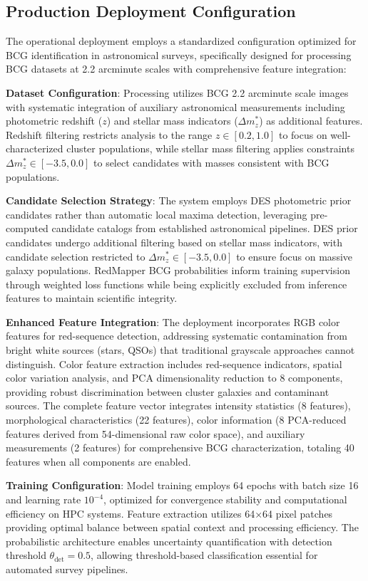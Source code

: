 \documentclass[twocolumn,10pt]{aastex631}
\begin{document}
\subsection{Production Deployment Configuration}

The operational deployment employs a standardized configuration optimized for BCG identification in astronomical surveys, specifically designed for processing BCG datasets at 2.2 arcminute scales with comprehensive feature integration:

\textbf{Dataset Configuration}: Processing utilizes BCG 2.2 arcminute scale images with systematic integration of auxiliary astronomical measurements including photometric redshift ($z$) and stellar mass indicators ($\Delta m^*_z$) as additional features. Redshift filtering restricts analysis to the range $z \in [0.2, 1.0]$ to focus on well-characterized cluster populations, while stellar mass filtering applies constraints $\Delta m^*_z \in [-3.5, 0.0]$ to select candidates with masses consistent with BCG populations.

\textbf{Candidate Selection Strategy}: The system employs DES photometric prior candidates rather than automatic local maxima detection, leveraging pre-computed candidate catalogs from established astronomical pipelines. DES prior candidates undergo additional filtering based on stellar mass indicators, with candidate selection restricted to $\Delta m^*_z \in [-3.5, 0.0]$ to ensure focus on massive galaxy populations. RedMapper BCG probabilities inform training supervision through weighted loss functions while being explicitly excluded from inference features to maintain scientific integrity.

\textbf{Enhanced Feature Integration}: The deployment incorporates RGB color features for red-sequence detection, addressing systematic contamination from bright white sources (stars, QSOs) that traditional grayscale approaches cannot distinguish. Color feature extraction includes red-sequence indicators, spatial color variation analysis, and PCA dimensionality reduction to 8 components, providing robust discrimination between cluster galaxies and contaminant sources. The complete feature vector integrates intensity statistics (8 features), morphological characteristics (22 features), color information (8 PCA-reduced features derived from 54-dimensional raw color space), and auxiliary measurements (2 features) for comprehensive BCG characterization, totaling 40 features when all components are enabled.

\textbf{Training Configuration}: Model training employs 64 epochs with batch size 16 and learning rate $10^{-4}$, optimized for convergence stability and computational efficiency on HPC systems. Feature extraction utilizes 64×64 pixel patches providing optimal balance between spatial context and processing efficiency. The probabilistic architecture enables uncertainty quantification with detection threshold $\theta_{\text{det}} = 0.5$, allowing threshold-based classification essential for automated survey pipelines.
\end{document}
